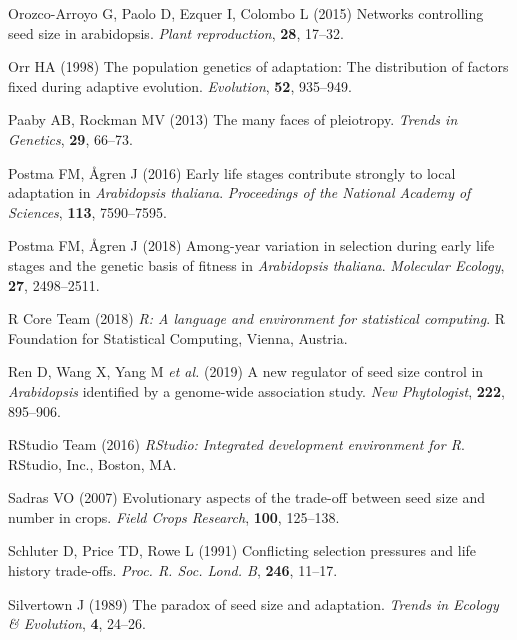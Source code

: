 \documentclass[]{article}
\begin{document}
\leavevmode\hypertarget{ref-orozco2015networks}{}%
Orozco-Arroyo G, Paolo D, Ezquer I, Colombo L (2015) Networks controlling seed size in arabidopsis. \emph{Plant reproduction}, \textbf{28}, 17--32.

\leavevmode\hypertarget{ref-orr1998population}{}%
Orr HA (1998) The population genetics of adaptation: The distribution of factors fixed during adaptive evolution. \emph{Evolution}, \textbf{52}, 935--949.

\leavevmode\hypertarget{ref-paaby2013many}{}%
Paaby AB, Rockman MV (2013) The many faces of pleiotropy. \emph{Trends in Genetics}, \textbf{29}, 66--73.

\leavevmode\hypertarget{ref-postma_early_2016}{}%
Postma FM, Ågren J (2016) Early life stages contribute strongly to local adaptation in \emph{Arabidopsis thaliana}. \emph{Proceedings of the National Academy of Sciences}, \textbf{113}, 7590--7595.

\leavevmode\hypertarget{ref-postma2018among}{}%
Postma FM, Ågren J (2018) Among-year variation in selection during early life stages and the genetic basis of fitness in \emph{Arabidopsis thaliana}. \emph{Molecular Ecology}, \textbf{27}, 2498--2511.

\leavevmode\hypertarget{ref-RCT2015}{}%
R Core Team (2018) \emph{R: A language and environment for statistical computing}. R Foundation for Statistical Computing, Vienna, Austria.

\leavevmode\hypertarget{ref-ren2019new}{}%
Ren D, Wang X, Yang M \emph{et al.} (2019) A new regulator of seed size control in \emph{Arabidopsis} identified by a genome-wide association study. \emph{New Phytologist}, \textbf{222}, 895--906.

\leavevmode\hypertarget{ref-RStudioTeam2015}{}%
RStudio Team (2016) \emph{RStudio: Integrated development environment for R}. RStudio, Inc., Boston, MA.

\leavevmode\hypertarget{ref-Sadras2007}{}%
Sadras VO (2007) Evolutionary aspects of the trade-off between seed size and number in crops. \emph{Field Crops Research}, \textbf{100}, 125--138.

\leavevmode\hypertarget{ref-schluter1991conflicting}{}%
Schluter D, Price TD, Rowe L (1991) Conflicting selection pressures and life history trade-offs. \emph{Proc. R. Soc. Lond. B}, \textbf{246}, 11--17.

\leavevmode\hypertarget{ref-Silvertown1989}{}%
Silvertown J (1989) The paradox of seed size and adaptation. \emph{Trends in Ecology \& Evolution}, \textbf{4}, 24--26.
\end{document}
